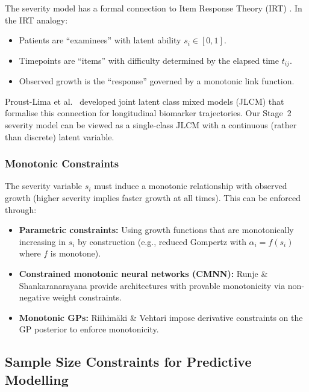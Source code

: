 The severity model has a formal connection to Item Response Theory (IRT)
\cite{embretson2000irt}. In the IRT analogy:
\begin{itemize}[leftmargin=*]
  \item Patients are ``examinees'' with latent ability $s_i \in [0, 1]$.
  \item Timepoints are ``items'' with difficulty determined by the elapsed
    time $t_{ij}$.
  \item Observed growth is the ``response'' governed by a monotonic link
    function.
\end{itemize}
Proust-Lima et al.\ \cite{proustlima2014joint,proustlima2023lcmm} developed
joint latent class mixed models (JLCM) that formalise this connection for
longitudinal biomarker trajectories. Our Stage~2 severity model can be viewed
as a single-class JLCM with a continuous (rather than discrete) latent
variable.

\subsubsection{Monotonic Constraints}

The severity variable $s_i$ must induce a monotonic relationship with
observed growth (higher severity implies faster growth at all times). This
can be enforced through:
\begin{itemize}[leftmargin=*]
  \item \textbf{Parametric constraints:} Using growth functions that are
    monotonically increasing in $s_i$ by construction (e.g., reduced
    Gompertz with $\alpha_i = f(s_i)$ where $f$ is monotone).
  \item \textbf{Constrained monotonic neural networks (CMNN):}
    Runje \& Shankaranarayana \cite{runje2023cmnn} provide architectures
    with provable monotonicity via non-negative weight constraints.
  \item \textbf{Monotonic GPs:} Riihim\"{a}ki \& Vehtari
    \cite{riihimaki2010monotonic} impose derivative constraints on the GP
    posterior to enforce monotonicity.
\end{itemize}

\subsection{Sample Size Constraints for Predictive Modelling}
\label{sec:bg:sample_size}

